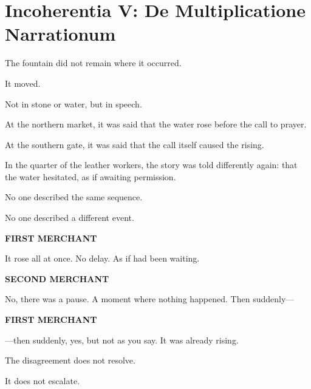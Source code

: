 
\chapter*{Incoherentia V: De Multiplicatione Narrationum}


The fountain did not remain where it occurred.

It moved.

Not in stone or water, but in speech.

\medskip

At the northern market, it was said that the water rose before the call to prayer.

At the southern gate, it was said that the call itself caused the rising.

In the quarter of the leather workers, the story was told differently again:
that the water hesitated, as if awaiting permission.

\medskip

No one described the same sequence.

No one described a different event.

\medskip

\textbf{FIRST MERCHANT}

It rose all at once. No delay. As if  had been waiting.

\medskip

\textbf{SECOND MERCHANT}

No, there was a pause. A moment where nothing happened. Then suddenly---

\medskip

\textbf{FIRST MERCHANT}

---then suddenly, yes, but not as you say. It was already rising.

\medskip

The disagreement does not resolve.

It does not escalate.

